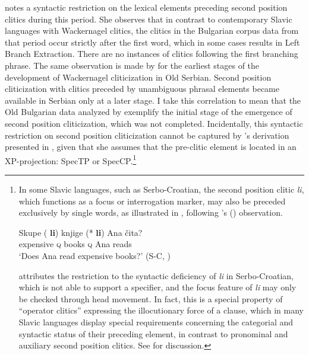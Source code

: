 \documentclass[output=paper,modfonts,newtxmath,hidelinks]{langscibook}
\begin{document}
\citeauthor{pancheva2005} notes a syntactic restriction on the lexical elements preceding second position clitics during this period. She observes that in contrast to contemporary Slavic languages with Wackernagel clitics, the clitics in the Bulgarian corpus data from that period occur strictly after the first word, which in some cases results in Left Branch Extraction. There are no instances of clitics following the first branching phrase. The same observation is made by \citet[Chapter 3]{radanovickocic1988} for the earliest stages of the development of Wackernagel cliticization in Old Serbian. Second position cliticization with clitics preceded by unambiguous phrasal elements became available in Serbian only at a later stage. I take this correlation to mean that the Old Bulgarian data analyzed by \citet{pancheva2005} exemplify the initial stage of the emergence of second position cliticization, which was not completed. Incidentally, this syntactic restriction on second position cliticization cannot be captured by \citeauthor{pancheva2005}’s derivation presented in , given that she assumes that the pre-clitic element is located in an XP-projection: SpecTP or SpecCP.\footnote{\label{11:fn1}In some Slavic languages, such as Serbo-Croatian, the second position clitic \textit{li}, which functions as a focus or interrogation marker, may also be preceded exclusively by single words, as illustrated in , following \citeauthor{Boskovic2001}'s (\citeyear[27]{Boskovic2001}) observation.

\ea \label{11:exfni}
\gll Skupe (\hspace{-2pt} \textbf{li}) knjige (*\hspace{-2pt} \textbf{li}) Ana čita?\\
expensive {} \textsc{q} books {} \textsc{q} Ana reads\\
\glt `Does Ana read expensive books?' \hfill(S-C, \citealt[27]{Boskovic2001})
\z

\noindent \citet[31ff.]{Boskovic2001} attributes the restriction to the syntactic deficiency of \textit{li} in Serbo-Croatian, which is not able to support a specifier, and the focus feature of \textit{li} may only be checked through head movement. In fact, this is a special property of “operator clitics” expressing the illocutionary force of a clause, which in many Slavic languages display special requirements concerning the categorial and syntactic status of their preceding element, in contrast to pronominal and auxiliary second position clitics. See \citet[Chapter 3]{migdalski2016} for discussion.}
\end{document}

